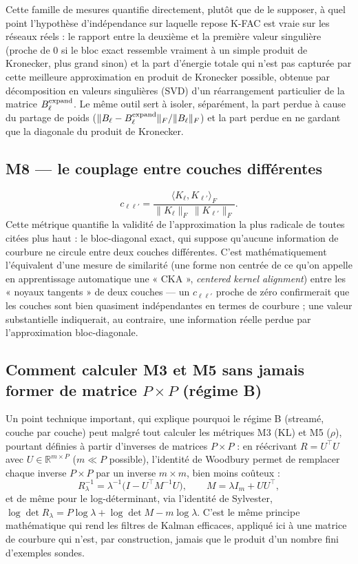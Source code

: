 \documentclass[11pt,a4paper]{article}
\newcommand{\eng}[1]{\emph{#1}}
\begin{document}
Cette famille de mesures quantifie directement, plutôt que de le supposer, à quel point
l'hypothèse d'indépendance sur laquelle repose K-FAC est vraie sur les réseaux réels : le rapport
entre la deuxième et la première valeur singulière (proche de 0 si le bloc exact ressemble
vraiment à un simple produit de Kronecker, plus grand sinon) et la part d'énergie totale qui n'est
pas capturée par cette meilleure approximation en produit de Kronecker possible, obtenue par
décomposition en valeurs singulières (SVD) d'un réarrangement particulier de la matrice
$B_\ell^{\rm expand}$. Le même outil sert à isoler, séparément, la part perdue à cause du partage de
poids ($\|B_\ell - B_\ell^{\rm expand}\|_F/\|B_\ell\|_F$) et la part perdue en ne gardant que la
diagonale du produit de Kronecker.

\subsection{M8 — le couplage entre couches différentes}

\[
c_{\ell\ell'} = \frac{\langle K_\ell, K_{\ell'}\rangle_F}{\|K_\ell\|_F\,\|K_{\ell'}\|_F}.
\]
Cette métrique quantifie la validité de l'approximation la plus radicale de toutes citées plus
haut : le bloc-diagonal exact, qui suppose qu'aucune information de courbure ne circule entre deux
couches différentes. C'est mathématiquement l'équivalent d'une mesure de similarité (une forme non
centrée de ce qu'on appelle en apprentissage automatique une « CKA », \eng{centered kernel
alignment}) entre les « noyaux tangents » de deux couches — un $c_{\ell\ell'}$ proche de zéro
confirmerait que les couches sont bien quasiment indépendantes en termes de courbure ; une valeur
substantielle indiquerait, au contraire, une information réelle perdue par l'approximation
bloc-diagonale.

\subsection{Comment calculer M3 et M5 sans jamais former de matrice $P\times P$ (régime B)}

Un point technique important, qui explique pourquoi le régime B (streamé, couche par couche) peut
malgré tout calculer les métriques M3 (KL) et M5 ($\rho$), pourtant définies à partir d'inverses de
matrices $P\times P$ : en réécrivant $R=U^\top U$ avec $U\in\mathbb R^{m\times P}$ ($m\ll P$
possible), l'identité de Woodbury permet de remplacer chaque inverse $P\times P$ par un inverse
$m\times m$, bien moins coûteux :
\[
R_\lambda^{-1} = \lambda^{-1}\big(I - U^\top M^{-1} U\big), \qquad M = \lambda I_m + UU^\top,
\]
et de même pour le log-déterminant, via l'identité de Sylvester,
$\log\det R_\lambda = P\log\lambda + \log\det M - m\log\lambda$. C'est le même principe
mathématique qui rend les filtres de Kalman efficaces, appliqué ici à une matrice de courbure qui
n'est, par construction, jamais que le produit d'un nombre fini d'exemples sondes.
\end{document}
